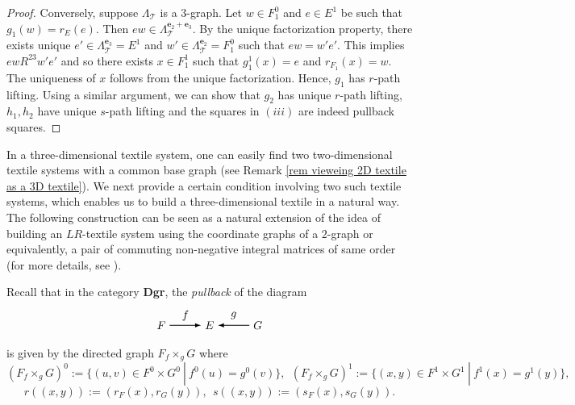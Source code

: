 \documentclass[a4paper,reqno,12pt]{amsart}
\newcommand{\eb}{\mathbf{e}_2}
\newcommand{\ec}{\mathbf{e}_3}
\theoremstyle{definition}
\theoremstyle{remark}
\begin{document}
\begin{proof}
Conversely, suppose $\Lambda_{\mathcal{T}}$ is a $3$-graph. Let $w\in F_1^0$ and $e\in E^1$ be such that $g_1(w)=r_E(e)$. Then $ew\in \Lambda_{\mathcal{T}}^{\eb+\ec}$. By the unique factorization property, there exists unique $e'\in \Lambda_{\mathcal{T}}^{\ec}=E^1$ and $w'\in \Lambda_{\mathcal{T}}^{\eb}=F_1^0$ such that $ew=w'e'$. This implies $ew R^{23} w'e'$ and so there exists $x\in F_1^1$ such that $g_1^1(x)=e$ and $r_{F_1}(x)=w$. The uniqueness of $x$ follows from the unique factorization. Hence, $g_1$ has $r$-path lifting. Using a similar argument, we can show that $g_2$ has unique $r$-path lifting, $h_1,h_2$ have unique $s$-path lifting and the squares in $(iii)$ are indeed pullback squares. 
\end{proof}

In a three-dimensional textile system, one can easily find two two-dimensional textile systems with a common base graph (see Remark \ref{rem vieweing 2D textile as a 3D textile}). We next provide a certain condition involving two such textile systems, which enables us to build a three-dimensional textile in a natural way. The following construction can be seen as a natural extension of the idea of building an $LR$-textile system using the coordinate graphs of a $2$-graph \cite[Proposition 3.7]{Deaconu} or equivalently, a pair of commuting non-negative integral matrices of same order (for more details, see \cite[\S 9.1]{Matsumoto}).

Recall that in the category \textbf{Dgr}, the \emph{pullback} of the diagram 
\[
\begin{tikzpicture}[scale=1]
\node[] (A) at (0,0) {$F$};	
\node[] (B) at (1.5,0) {$E$};
\node[] (C) at (3,0) {$G$};
	
\path[->,black, >=latex,thick] (A) edge [left] node[above=0.05cm]{} (B);
\path[->,black, >=latex,thick] (C) edge [left] node[above=0.05cm]{} (B);

\node at (0.75,0.3) {$f$};
\node at (2.25,0.3) {$g$};
\end{tikzpicture}
\] 
is given by the directed graph $F{{}_{f}\times_{g}} G$ where \[(F{{}_{f}\times_{g}} G)^0:=\{(u,v)\in F^0\times G^0~|~f^0(u)=g^0(v)\},~~(F{{}_{f}\times_{g}} G)^1:=\{(x,y)\in F^1\times G^1~|~f^1(x)=g^1(y)\},\] \[r((x,y)):=(r_F(x),r_G(y)),~~s((x,y)):=(s_F(x),s_G(y)).\]
\end{document}
